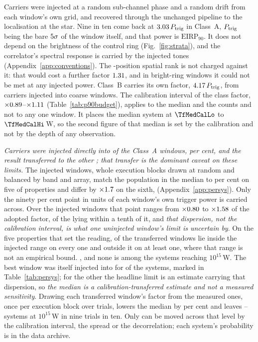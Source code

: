 Carriers were injected at a random sub-channel phase and a random drift from
each window's own grid, and recovered through the unchanged pipeline to the
localisation at the star. Nine in ten come back at
$3.03\,P_{\rm trig}$ in Class~A, $P_{\rm trig}$ being the bare
$5\sigma$ of the window itself, and that power is
$\mathrm{EIRP}_{90}$. It does not depend on the brightness of the control ring
(Fig.~\ref{fig:strata}), and the correlator's spectral response is carried by
the injected tones (Appendix~\ref{app:conventions}). The \NCtrl-position
spatial rank is not charged against it: that would cost a further factor
$1.31$, and in \SensNRingHiUnres{} bright-ring windows it could not be
met at any injected power. Class~B carries its own factor,
$4.17\,P_{\rm trig}$, from \SensNToneCoarse{} carriers injected
into \SensNInjCoarse{} coarse windows. The calibration interval of the class factor,
$\times0.89$--$\times1.11$ (Table~\ref{tab:p90budget}), applies to the median and the counts and not to any one window. It places the
median system at $\TfMedCalLo$ to $\TfMedCalHi$\,W, so the second figure of that
median is set by the calibration and not by the depth of any observation.

\emph{Carriers were injected directly into \SensNInj{} of the \NWinA{}
Class~A windows, \SensNInjPct{} per cent, and the result transferred to the
other \SensNTransfer; that transfer is the dominant caveat on these limits.}
The injected windows, whole execution blocks drawn at random and balanced by
band and array, match the population in the median to \RpCovOtherPct{} per
cent on five of \RpNAxis{} properties and differ by $\times1.7$
on the sixth, \RpCovWorstAxis{} (Appendix~\ref{app:persys}). Only the ninety
per cent point in units of each window's own trigger power is carried across.
Over the injected windows that point ranges from $\times0.80$ to
$\times1.58$ of the adopted factor, \NmDispNTenth{} of the
\SensNInj{} lying within a tenth of it, and \emph{that dispersion, not the
calibration interval, is what one uninjected window's limit is uncertain by}.
On the five properties that set the reading, \NgNInterpWin{} of the
\SensNTransfer{} transferred windows lie inside the injected range on every
one and \NgNExtrapWin{} outside it on at least one, where that range is not an
empirical bound. \NgExtrapTakeClause{}, and none is among the \NSysEfifteen{}
systems reaching $10^{15}$\,W. The best window was itself injected into for
\SmcNMeasSys{} of the \NSysALim{} systems, marked in Table~\ref{tab:persys};
for the other \SmcNEstSys{} the headline limit is an estimate carrying that
dispersion, so \emph{the median is a calibration-transferred estimate and not
a measured sensitivity}. Drawing each transferred window's factor from the
\SensNInj{} measured ones, once per execution block over \SvNTrial{} trials,
lowers the median by \SvRsMedShiftPct{} per cent and leaves
\SvRsBlkNLo--\SvRsBlkNHi{} systems at $10^{15}$\,W in nine trials in ten.
Only \SvUncInNames{} can be moved across that level by the calibration
interval, the spread or the decorrelation\SvUncOutClause; each system's
probability is in the data archive.

